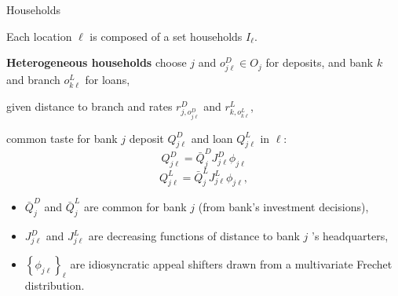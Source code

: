 \documentclass[notes,10pt, aspectratio=169]{beamer}
\newenvironment{wideitemize}{\itemize\addtolength{\itemsep}{10pt}}{\enditemize}
\begin{document}
\begin{frame}{Households}

    \begin{wideitemize}
        \item  Each location $\ell$ is composed of a set households $I_{\ell}$.
        \item \textbf{Heterogeneous households} choose  $j$ and  $o^D_{j \ell} \in O_j$ for deposits, and 
        bank $k$ and branch $o^L_{k \ell}$ for loans,
        
        \item given distance to branch and rates $r_{j, o_{j \ell}^D}^D$ and $r_{k, o_{k \ell}^L}^L$,


        \item  common taste for bank $j$ deposit $Q_{j \ell}^D$ and loan $Q_{j \ell}^L$  in $\ell$: 
\begin{equation}
Q_{j \ell}^D=\bar{Q}_j^D J_{j \ell}^D \phi_{j \ell}
\end{equation}
\begin{equation}
Q_{j \ell}^L=\bar{Q}_j^L J_{j \ell}^L \phi_{j \ell},
\end{equation}

        \begin{itemize}
            \item $\bar{Q}_j^D$ and $\bar{Q}_j^L$ are common for bank $j$ (from bank's investment decisions), 
            \item $J_{j \ell}^D$ and $J_{j \ell}^L$ are decreasing functions of distance to bank $j$ 's headquarters, 
            \item $\left\{\phi_{j \ell}\right\}_{\ell}$ are idiosyncratic appeal shifters drawn from a multivariate Frechet distribution.
        \end{itemize}


\end{wideitemize}
\end{frame}
\end{document}

